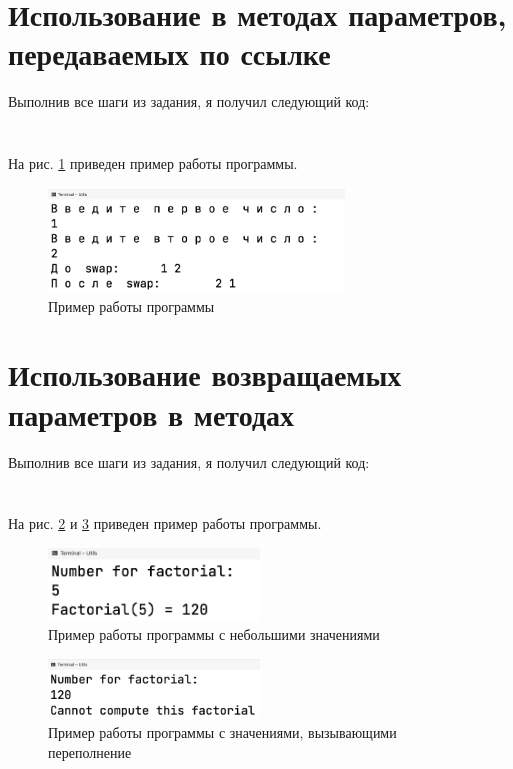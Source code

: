 \documentclass[a4paper,14pt]{extarticle}
\numberwithin{figure}{section}
\begin{document}
\section{Использование в методах параметров, передаваемых по ссылке}

Выполнив все шаги из задания, я получил следующий код:

\inputminted{csharp}{../Utils/Utils/Utils1.cs}

\inputminted{csharp}{../Utils/Utils/Program1.cs}

На рис. \ref{fig:task-2} приведен пример работы программы.

\begin{figure}[H]
    \centering
    \includegraphics[width=0.7\textwidth]{images/task-2.png}
    \caption{Пример работы программы}
    \label{fig:task-2}
\end{figure}

\section{Использование возвращаемых параметров в методах}

Выполнив все шаги из задания, я получил следующий код:

\inputminted{csharp}{../Utils/Utils/Utils2.cs}

\inputminted{csharp}{../Utils/Utils/Program2.cs}

На рис. \ref{fig:task-3-1} и \ref{fig:task-3-2} приведен пример работы программы.

\begin{figure}[H]
    \centering
    \includegraphics[width=0.5\textwidth]{images/task-3-1.png}
    \caption{Пример работы программы с небольшими значениями}
    \label{fig:task-3-1}
\end{figure}

\begin{figure}[H]
    \centering
    \includegraphics[width=0.5\textwidth]{images/task-3-2.png}
    \caption{Пример работы программы с значениями, вызывающими переполнение}
    \label{fig:task-3-2}
\end{figure}
\end{document}
